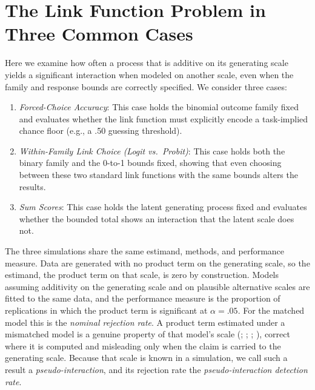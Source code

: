 \documentclass[
  man,
  floatsintext,
  longtable,
  nolmodern,
  notxfonts,
  notimes,
  colorlinks=true,linkcolor=blue,citecolor=blue,urlcolor=blue]{apa7}
\providecommand{\tightlist}{%
  \setlength{\itemsep}{0pt}\setlength{\parskip}{0pt}}
\begin{document}
\section{The Link Function Problem in Three Common
Cases}\label{the-link-function-problem-in-three-common-cases}

Here we examine how often a process that is additive on its generating
scale yields a significant interaction when modeled on another scale,
even when the family and response bounds are correctly specified. We
consider three cases:

\begin{enumerate}
\def\labelenumi{\arabic{enumi}.}
\tightlist
\item
  \emph{Forced-Choice Accuracy}: This case holds the binomial outcome
  family fixed and evaluates whether the link function must explicitly
  encode a task-implied chance floor (e.g., a .50 guessing threshold).
\item
  \emph{Within-Family Link Choice (Logit vs.~Probit)}: This case holds
  both the binary family and the 0-to-1 bounds fixed, showing that even
  choosing between these two standard link functions with the same
  bounds alters the results.
\item
  \emph{Sum Scores}: This case holds the latent generating process fixed
  and evaluates whether the bounded total shows an interaction that the
  latent scale does not.
\end{enumerate}

The three simulations share the same estimand, methods, and performance
measure. Data are generated with no product term on the generating
scale, so the estimand, the product term on that scale, is zero by
construction. Models assuming additivity on the generating scale and on
plausible alternative scales are fitted to the same data, and the
performance measure is the proportion of replications in which the
product term is significant at \(\alpha = .05\). For the matched model
this is the \emph{nominal rejection rate}. A product term estimated
under a mismatched model is a genuine property of that model's scale
(; ; ;
), correct where it is
computed and misleading only when the claim is carried to the generating
scale. Because that scale is known in a simulation, we call such a
result a \emph{pseudo-interaction}, and its rejection rate the
\emph{pseudo-interaction detection rate}.
\end{document}
